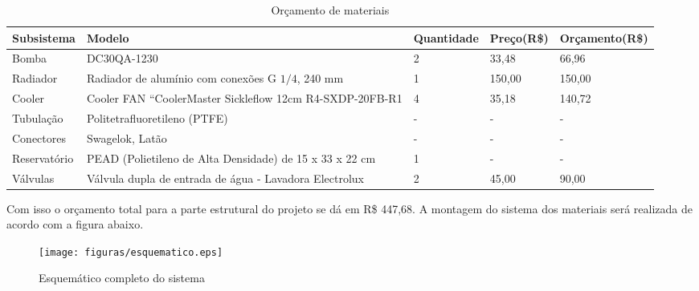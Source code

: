 \begin{table}[htb]
\begin{tabular}{|p{3cm}|p{4cm}|p{3cm}|p{2cm}|p{3cm}|}
\hline
Subsistema & Modelo & Quantidade & Preço(R\$) & Orçamento(R\$) \\
\hline
Bomba & DC30QA-1230  & 2 & 33,48 & 66,96 \\ \hline
Radiador & Radiador de alumínio com conexões G $1/4$, 240 mm & 1 & 150,00 & 150,00\\ \hline
Cooler & Cooler FAN “CoolerMaster Sickleflow 12cm R4-SXDP-20FB-R1 & 4 & 35,18 & 140,72\\ \hline
Tubulação & Politetrafluoretileno (PTFE) & - & - & -\\ \hline
Conectores & Swagelok, Latão & - & -  & - \\ \hline
Reservatório & PEAD (Polietileno de Alta Densidade) de 15 x 33 x 22 cm & 1 & - & - \\ \hline
Válvulas & Válvula dupla de entrada de água - Lavadora Electrolux  & 2 & 45,00 & 90,00\\ \hline
\hline
\end{tabular}
\caption{Orçamento de materiais}
\end{table}

Com isso o orçamento total para a parte estrutural do projeto se dá em R\$ 447,68.
A montagem do sistema dos materiais será realizada de acordo com a figura abaixo.


\begin{figure}[!htb]                                                               
   \centering                                                                      
   \texttt{[image: figuras/esquematico.eps]} 
   \caption{Esquemático completo do sistema}
\end{figure}

\newpage
